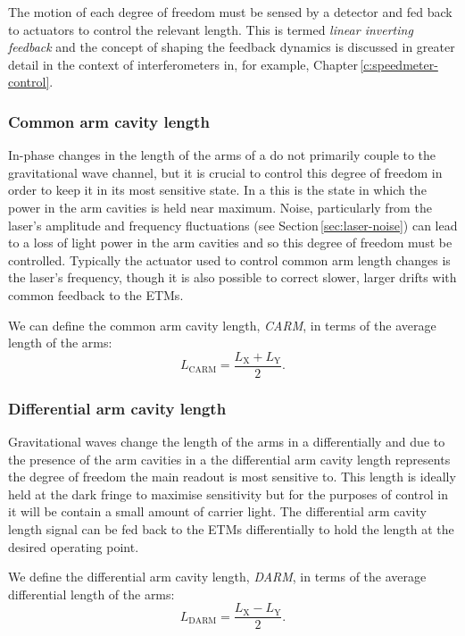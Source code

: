 
The motion of each degree of freedom must be sensed by a detector and fed back to actuators to control the relevant length. This is termed \emph{linear inverting feedback} and the concept of shaping the feedback dynamics is discussed in greater detail in the context of interferometers in, for example, Chapter\,\ref{c:speedmeter-control}.

\subsubsection{Common arm cavity length}
In-phase changes in the length of the arms of a \MI{} do not primarily couple to the gravitational wave channel, but it is crucial to control this degree of freedom in order to keep it in its most sensitive state. In a \DRFPMI{} this is the state in which the power in the arm cavities is held near maximum. Noise, particularly from the laser's amplitude and frequency fluctuations (see Section\,\ref{sec:laser-noise}) can lead to a loss of light power in the arm cavities and so this degree of freedom must be controlled. Typically the actuator used to control common arm length changes is the laser's frequency, though it is also possible to correct slower, larger drifts with common feedback to the \glspl{ETM}.

We can define the common arm cavity length, \emph{\gls{CARM}}, in terms of the average length of the arms:
\begin{equation}
  L_{\text{CARM}} = \frac{L_{\text{X}} + L_{\text{Y}}}{2}.
\end{equation}

\subsubsection{Differential arm cavity length}
Gravitational waves change the length of the arms in a \MI{} differentially and due to the presence of the arm cavities in a \DRFPMI{} the differential arm cavity length represents the degree of freedom the main readout is most sensitive to. This length is ideally held at the dark fringe to maximise sensitivity but for the purposes of control in \ETLF{} it will be contain a small amount of carrier light. The differential arm cavity length signal can be fed back to the \glspl{ETM} differentially to hold the length at the desired operating point.

We define the differential arm cavity length, \emph{\gls{DARM}}, in terms of the average differential length of the arms:
\begin{equation}
  L_{\text{DARM}} = \frac{L_{\text{X}} - L_{\text{Y}}}{2}.
\end{equation}

